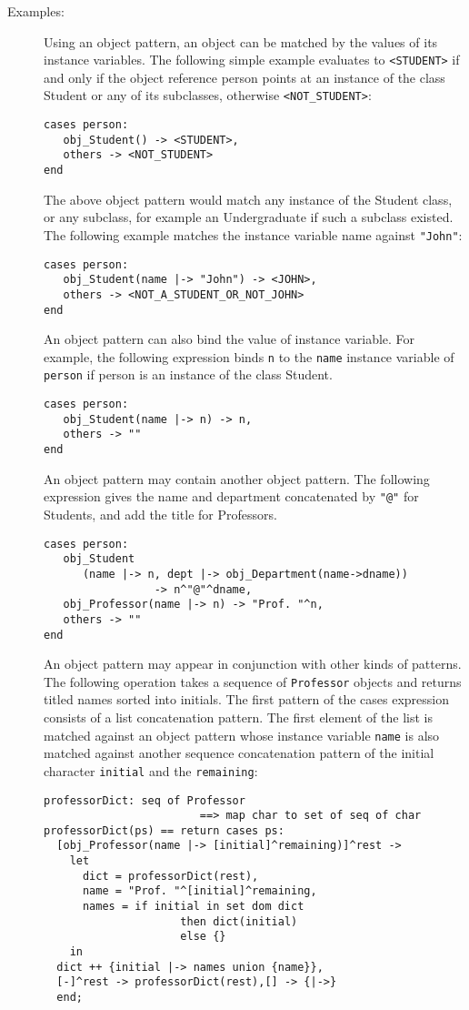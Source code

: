 \documentclass{overturerepchap}
\begin{document}
{\begin{description}
\item[Examples:] Using an object pattern, an object can be matched by the values of its instance variables. The following simple example evaluates to \texttt{<STUDENT>} if and only if the object reference person points at an instance of the class Student or any of its subclasses, otherwise \texttt{<NOT\_STUDENT>}:
\begin{lstlisting}
cases person:
   obj_Student() -> <STUDENT>,
   others -> <NOT_STUDENT>
end
\end{lstlisting}

The above object pattern would match any instance of the Student class, or any subclass, for example an Undergraduate if such a subclass existed. The following example matches the instance variable name against \texttt{"John"}:

\begin{lstlisting}
cases person:
   obj_Student(name |-> "John") -> <JOHN>,
   others -> <NOT_A_STUDENT_OR_NOT_JOHN>
end
\end{lstlisting}
An object pattern can also bind the value of instance variable. For example, the following expression binds \texttt{n} to the \texttt{name} instance variable of  \texttt{person} if person is an instance of the class Student.

\begin{lstlisting}
cases person:
   obj_Student(name |-> n) -> n,
   others -> ""
end
\end{lstlisting}
An object pattern may contain another object pattern. The following expression gives the name and department concatenated by \texttt{"@"} for Students, and add the title for Professors.
\begin{lstlisting}
cases person:
   obj_Student
      (name |-> n, dept |-> obj_Department(name->dname))
                 -> n^"@"^dname,
   obj_Professor(name |-> n) -> "Prof. "^n,
   others -> ""
end
\end{lstlisting}
An object pattern may appear in conjunction with other kinds of patterns. The following operation takes a sequence of \texttt{Professor} objects and returns titled names sorted into initials. The first pattern of the cases expression consists of a list concatenation pattern. The first element of the list is matched against an object pattern whose instance variable {\tt name} is also matched against another sequence concatenation pattern of the initial character {\tt initial} and the  {\tt remaining}:

\begin{lstlisting}
professorDict: seq of Professor
                        ==> map char to set of seq of char
professorDict(ps) == return cases ps:
  [obj_Professor(name |-> [initial]^remaining)]^rest ->
    let
      dict = professorDict(rest),
      name = "Prof. "^[initial]^remaining,
      names = if initial in set dom dict
                     then dict(initial)
                     else {}
    in
  dict ++ {initial |-> names union {name}},
  [-]^rest -> professorDict(rest),[] -> {|->}
  end;
\end{lstlisting}  


\end{description}}
\end{document}

